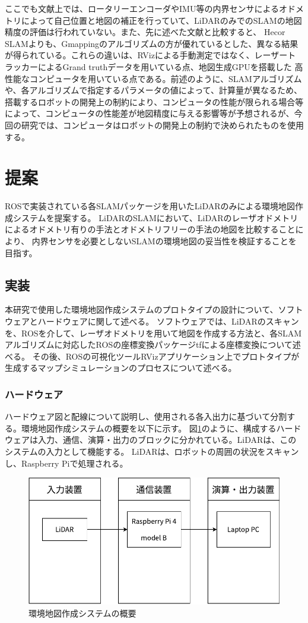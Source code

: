 ここでも文献上では、ロータリーエンコーダやIMU等の内界センサによるオドメトリによって自己位置と地図の補正を行っていて、LiDARのみでのSLAMの地図精度の評価は行われていない。また、先に述べた文献と比較すると、
Hecor SLAMよりも、Gmappingのアルゴリズムの方が優れているとした、異なる結果が得られている。これらの違いは、RVizによる手動測定ではなく、レーザートラッカーによるGrand truthデータを用いている点、地図生成GPUを搭載した
高性能なコンピュータを用いている点である。前述のように、SLAMアルゴリズムや、各アルゴリズムで指定するパラメータの値によって、計算量が異なるため、搭載するロボットの開発上の制約により、コンピュータの性能が限られる場合等によって、コンピュータの性能差が地図精度に与える影響等が予想されるが、今回の研究では、コンピュータはロボットの開発上の制約で決められたものを使用する。

\section{提案}
ROSで実装されている各SLAMパッケージを用いたLiDARのみによる環境地図作成システムを提案する。
LiDARのSLAMにおいて、LiDARのレーザオドメトリによるオドメトリ有りの手法とオドメトリフリーの手法の地図を比較することにより、
内界センサを必要としないSLAMの環境地図の妥当性を検証することを目指す。

\subsection{実装}
本研究で使用した環境地図作成システムのプロトタイプの設計について、ソフトウェアとハードウェアに関して述べる。
ソフトウェアでは、LiDARのスキャンを、ROSを介して、レーザオドメトリを用いて地図を作成する方法と、各SLAMアルゴリズムに対応したROSの座標変換パッケージtfによる座標変換について述べる。
その後、ROSの可視化ツールRVizアプリケーション上でプロトタイプが生成するマップシミュレーションのプロセスについて述べる。

\subsubsection{ハードウェア}
ハードウェア図と配線について説明し、使用される各入出力に基づいて分割する。環境地図作成システムの概要を以下に示す。
図\ref{slam:hard}のように、構成するハードウェアは入力、通信、演算・出力のブロックに分かれている。LiDARは、このシステムの入力として機能する。
LiDARは、ロボットの周囲の状況をスキャンし、Raspberry Piで処理される。

\begin{figure}[h]
  \begin{center}
  \includegraphics[width=.6\linewidth]{img/slam_21.pdf}
  \caption{環境地図作成システムの概要}
  \label{slam:hard}
  \end{center}
\end{figure}

